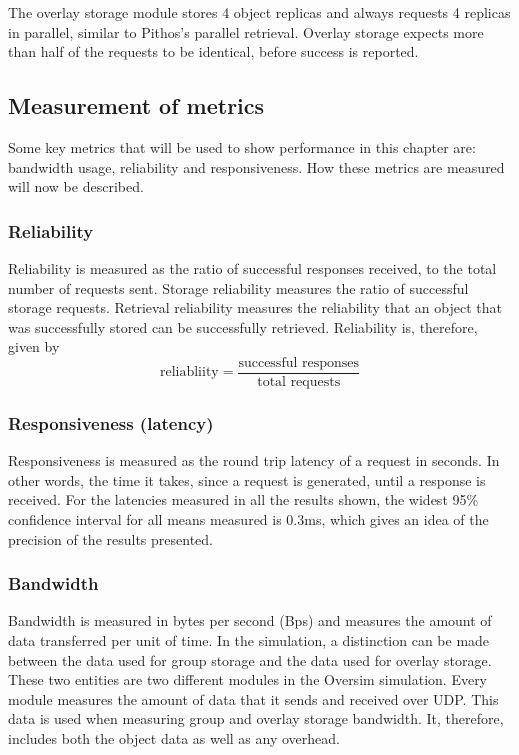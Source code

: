 The overlay storage module stores 4 object replicas and always requests 4 replicas in parallel, similar to Pithos's parallel retrieval. Overlay storage expects more than half of the requests to be identical, before success is reported.

\subsection{Measurement of metrics}
\label{metric_measurement}

Some key metrics that will be used to show performance in this chapter are: bandwidth usage, reliability and responsiveness. How these metrics are measured will now be described.

\subsubsection{Reliability}
Reliability is measured as the ratio of successful responses received, to the total number of requests sent. Storage reliability measures the ratio of successful storage requests. Retrieval reliability measures the reliability that an object that was successfully stored can be successfully retrieved. Reliability is, therefore, given by
%
\begin{equation}
\textrm{reliabliity} = \frac{\textrm{successful responses}}{\textrm{total requests}}
\end{equation}

\subsubsection{Responsiveness (latency)}

Responsiveness is measured as the round trip latency of a request in seconds.  In other words, the time it takes, since a request is generated, until a response is received. For the latencies measured in all the results shown, the widest 95\% confidence interval for all means measured is 0.3ms, which gives an idea of the precision of the results presented.

\subsubsection{Bandwidth}

Bandwidth is measured in bytes per second (Bps) and measures the amount of data transferred per unit of time. In the simulation, a distinction can be made between the data used for group storage and the data used for overlay storage. These two entities are two different modules in the Oversim simulation. Every module measures the amount of data that it sends and received over UDP. This data is used when measuring group and overlay storage bandwidth. It, therefore, includes both the object data as well as any overhead.

